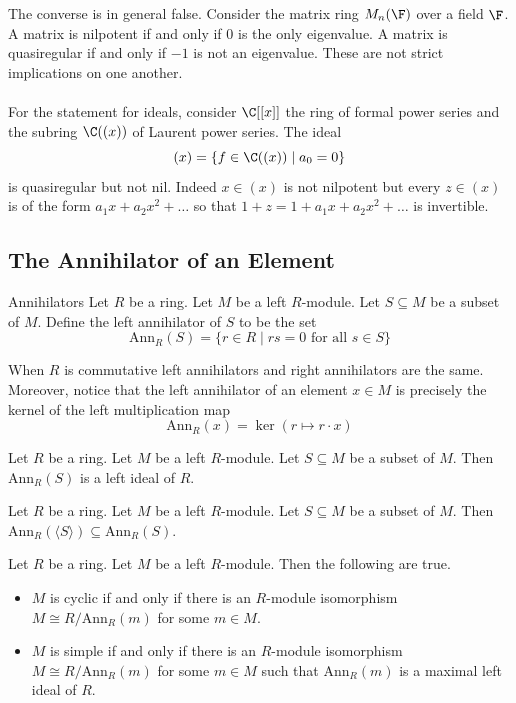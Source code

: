 \documentclass[a4paper]{article}
\begin{document}
The converse is in general false. Consider the matrix ring $M_n(\F)$ over a field $\F$. A matrix is nilpotent if and only if $0$ is the only eigenvalue. A matrix is quasiregular if and only if $-1$ is not an eigenvalue. These are not strict implications on one another. \\~\\

For the statement for ideals, consider $\C[[x]]$ the ring of formal power series and the subring $\C((x))$ of Laurent power series. The ideal $$(x)=\{f\in\C((x))\;|\;a_0=0\}$$ is quasiregular but not nil. Indeed $x\in(x)$ is not nilpotent but every $z\in(x)$ is of the form $a_1x+a_2x^2+\dots$ so that $1+z=1+a_1x+a_2x^2+\dots$ is invertible. 

\subsection{The Annihilator of an Element}
\begin{defn}{Annihilators}{} Let $R$ be a ring. Let $M$ be a left $R$-module. Let $S\subseteq M$ be a subset of $M$. Define the left annihilator of $S$ to be the set $$\text{Ann}_R(S)=\{r\in R\;|\;rs=0\text{ for all }s\in S\}$$
\end{defn}

When $R$ is commutative left annihilators and right annihilators are the same. Moreover, notice that the left annihilator of an element $x\in M$ is precisely the kernel of the left multiplication map $$\text{Ann}_R(x)=\ker(r\mapsto r\cdot x)$$

\begin{lmm}{}{} Let $R$ be a ring. Let $M$ be a left $R$-module. Let $S\subseteq M$ be a subset of $M$. Then $\text{Ann}_R(S)$ is a left ideal of $R$. 
\end{lmm}

\begin{prp}{}{} Let $R$ be a ring. Let $M$ be a left $R$-module. Let $S\subseteq M$ be a subset of $M$. Then $\text{Ann}_R(\langle S\rangle)\subseteq\text{Ann}_R(S)$. 
\end{prp}

\begin{prp}{}{} Let $R$ be a ring. Let $M$ be a left $R$-module. Then the following are true. 
\begin{itemize}
\item $M$ is cyclic if and only if there is an $R$-module isomorphism $M\cong R/\text{Ann}_R(m)$ for some $m\in M$. 
\item $M$ is simple if and only if there is an $R$-module isomorphism $M\cong R/\text{Ann}_R(m)$ for some $m\in M$ such that $\text{Ann}_R(m)$ is a maximal left ideal of $R$. 
\end{itemize}
\end{prp}
\end{document}
